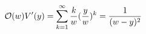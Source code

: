 \begin{equation}
{\cal O}(w) V'(y) =\sum_{k=1}^{\infty} \frac{k}{w} (\frac{y}{w})^k =
\frac{1}{(w-y)^2}
\end{equation}

